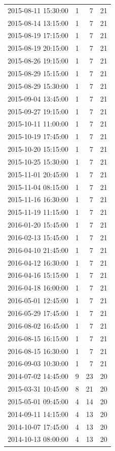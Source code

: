 \begin{tabular}{lrrr}
2015-08-11 15:30:00 & 1 & 7 & 21 \\
2015-08-14 13:15:00 & 1 & 7 & 21 \\
2015-08-19 17:15:00 & 1 & 7 & 21 \\
2015-08-19 20:15:00 & 1 & 7 & 21 \\
2015-08-26 19:15:00 & 1 & 7 & 21 \\
2015-08-29 15:15:00 & 1 & 7 & 21 \\
2015-08-29 15:30:00 & 1 & 7 & 21 \\
2015-09-04 13:45:00 & 1 & 7 & 21 \\
2015-09-27 19:15:00 & 1 & 7 & 21 \\
2015-10-11 11:00:00 & 1 & 7 & 21 \\
2015-10-19 17:45:00 & 1 & 7 & 21 \\
2015-10-20 15:15:00 & 1 & 7 & 21 \\
2015-10-25 15:30:00 & 1 & 7 & 21 \\
2015-11-01 20:45:00 & 1 & 7 & 21 \\
2015-11-04 08:15:00 & 1 & 7 & 21 \\
2015-11-16 16:30:00 & 1 & 7 & 21 \\
2015-11-19 11:15:00 & 1 & 7 & 21 \\
2016-01-20 15:45:00 & 1 & 7 & 21 \\
2016-02-13 15:45:00 & 1 & 7 & 21 \\
2016-04-10 21:45:00 & 1 & 7 & 21 \\
2016-04-12 16:30:00 & 1 & 7 & 21 \\
2016-04-16 15:15:00 & 1 & 7 & 21 \\
2016-04-18 16:00:00 & 1 & 7 & 21 \\
2016-05-01 12:45:00 & 1 & 7 & 21 \\
2016-05-29 17:45:00 & 1 & 7 & 21 \\
2016-08-02 16:45:00 & 1 & 7 & 21 \\
2016-08-15 16:15:00 & 1 & 7 & 21 \\
2016-08-15 16:30:00 & 1 & 7 & 21 \\
2016-09-03 10:30:00 & 1 & 7 & 21 \\
2014-07-02 14:45:00 & 9 & 23 & 20 \\
2015-03-31 10:45:00 & 8 & 21 & 20 \\
2015-05-01 09:45:00 & 4 & 14 & 20 \\
2014-09-11 14:15:00 & 4 & 13 & 20 \\
2014-10-07 17:45:00 & 4 & 13 & 20 \\
2014-10-13 08:00:00 & 4 & 13 & 20 \\

\end{tabular}
